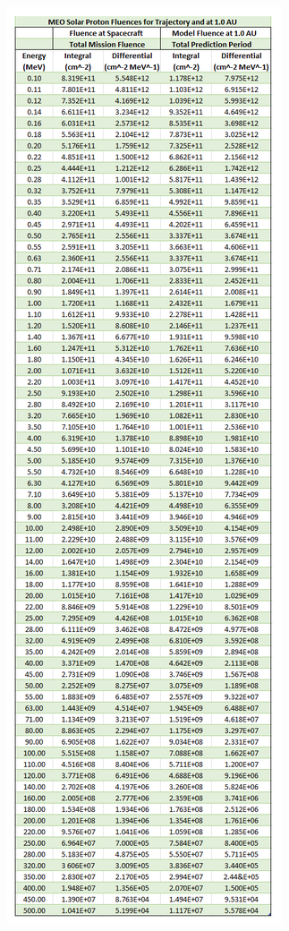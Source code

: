 \documentclass[11pt]{article}
\begin{document}
\begin{figure}
    \centering
    \begin{minipage}{\dimexpr.5\textwidth-1em}
        \centering
        \includegraphics[width=0.78\linewidth]{MEO_SP.png}

\end{minipage}
\end{figure}
\end{document}
